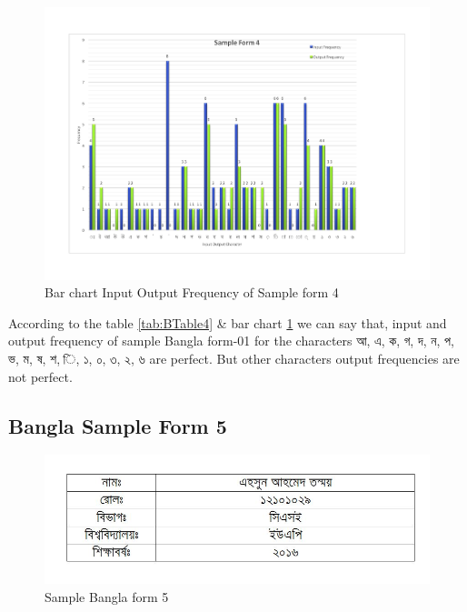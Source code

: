 \begin{figure}[H]
\centering
\includegraphics[width=1\textwidth]{Bform4.pdf}
\caption {Bar chart Input Output Frequency of Sample form 4}
\label {fig:Bbar4}
\end{figure}

According to the table \ref{tab:BTable4} \& bar chart \ref{fig:Bbar4} we can say that, input and output frequency of sample Bangla form-01 for the characters {\bengalifont আ, এ, ক, গ, দ, ন, প, ভ, ম, ষ, শ, ি, ১, ০, ৩, ২, ৬ }are perfect. But other characters output frequencies are not perfect.

\subsection{Bangla Sample Form 5}
\begin{figure}[H]
\centering
\includegraphics[width=1\textwidth]{formBen05.JPG}
\caption {Sample Bangla form 5}
\label {fig:FormBan5}
\end{figure}

